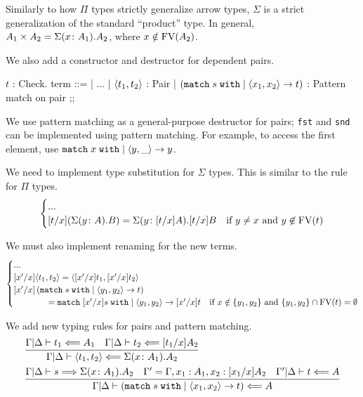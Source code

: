 \documentclass[acmsmall,nonacm]{acmart}
\begin{document}
\noindent
Similarly to how $\Pi$ types strictly generalize arrow types, $\Sigma$ is a strict generalization of the standard ``product'' type.
In general, $A_1 \times A_2 = \Sigma (x \colon A_1) . A_2$, where $x \notin \textnormal{FV}(A_2)$.

We also add a constructor and destructor for dependent pairs.

\begin{center}
\begin{bnf}
    $t$ : Check. term ::=
        | ...
        | $\langle t_1, t_2 \rangle$ : Pair
        | $\left( \texttt{match} \; s \; \texttt{with} \; | \; \langle x_1, x_2 \rangle \rightarrow t \right)$ : Pattern match on pair
        ;;
\end{bnf}
\end{center}

\noindent
We use pattern matching as a general-purpose destructor for pairs; \texttt{fst} and \texttt{snd} can be implemented using pattern matching.
For example, to access the first element, use $\texttt{match} \; x \; \texttt{with} \; | \; \langle y, \_ \rangle \rightarrow y$.

We need to implement type substitution for $\Sigma$ types.
This is similar to the rule for $\Pi$ types.
\begin{align*}
    \begin{cases}
        ... \\
        [t / x] (\Sigma (y \colon A) . B) = \Sigma (y \colon [t/x]A) . [t/x]B & \textnormal{if } y \neq x \textnormal{ and } y \not\in \textnormal{FV}(t)
    \end{cases}
\end{align*}

\noindent
We must also implement renaming for the new terms.
\begin{equation*}
    \begin{cases}
        ... \\
        [x' / x] \langle t_1, t_2 \rangle = \langle [x'/x]t_1, [x'/x]t_2 \rangle \\
        [x' / x] \left( \texttt{match} \; s \; \texttt{with} \; | \; \langle y_1, y_2 \rangle \rightarrow t \right)
            \\ \qquad\qquad = \texttt{match} \; [x'/x]s \; \texttt{with} \; | \; \langle y_1, y_2 \rangle \rightarrow [x'/x]t & \textnormal{if } x \notin \{y_1, y_2\} \textnormal{ and } \{y_1, y_2\} \cap \textnormal{FV}(t) = \emptyset
    \end{cases}
\end{equation*}

\noindent
We add new typing rules for pairs and pattern matching.
\begin{align*}
    & \infer{
        \Gamma|\Delta \vdash \pair{t_1}{t_2} \chk \sigmatype{x}{A_1}{A_2}
    }{
        \Gamma|\Delta \vdash t_1 \chk A_1
        & \Gamma|\Delta \vdash t_2 \chk [t_1/x] A_2
    } \\
    & \infer{
        \Gamma|\Delta \vdash \left( \pairmatch{s}{x_1}{x_2}{t} \right) \chk A
    }{
        \Gamma|\Delta \vdash s \syn \sigmatype{x}{A_1}{A_2}
        & \Gamma' = \Gamma , x_1:A_1 , x_2:[x_1/x]A_2
        & \Gamma'|\Delta \vdash t \chk A
    }
\end{align*}
\end{document}
